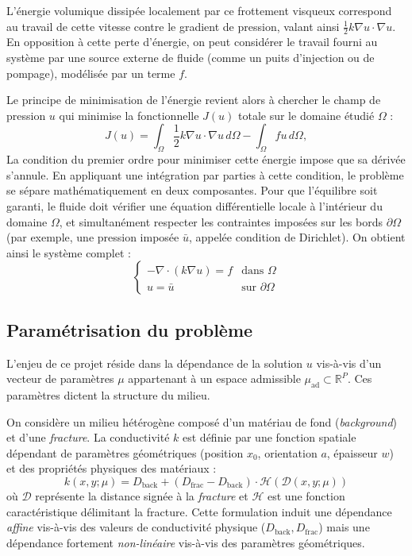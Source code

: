 \documentclass[12pt,a4paper]{article}
\begin{document}
L'énergie volumique dissipée localement par ce frottement visqueux correspond au travail de cette vitesse contre le gradient de pression, valant ainsi $\frac{1}{2} k \nabla u \cdot \nabla u$. 
En opposition à cette perte d'énergie, on peut considérer le travail fourni au système 
par une source externe de fluide (comme un puits d'injection ou de pompage), modélisée 
par un terme $f$.

Le principe de minimisation de l'énergie revient alors à chercher le champ de pression $u$ 
qui minimise la fonctionnelle $J(u)$ totale sur le domaine étudié $\Omega$ :
\begin{equation*}
    J(u) = \int_{\Omega} \frac{1}{2} k \nabla u \cdot \nabla u \, d\Omega - \int_{\Omega} f u \, d\Omega,
\end{equation*}
La condition du premier ordre pour minimiser cette énergie impose que sa dérivée s'annule. En appliquant une intégration par parties à cette condition, le problème se sépare mathématiquement en deux composantes. Pour que l'équilibre soit garanti, le fluide doit vérifier une équation différentielle locale à l'intérieur du domaine $\Omega$, et simultanément respecter les contraintes imposées sur les bords $\partial \Omega$ (par exemple, une pression imposée $\bar{u}$, appelée condition de Dirichlet). On obtient ainsi le système complet \cite{darcy_wiki} :
\begin{equation*}
  \begin{cases}
        -\nabla \cdot (k \nabla u) = f & \text{dans } \Omega \\
        u = \bar{u} & \text{sur } \partial \Omega
    \end{cases}
\end{equation*}

\subsection{Paramétrisation du problème}

L'enjeu de ce projet réside dans la dépendance de la solution $u$ vis-à-vis d'un vecteur de paramètres $\mu$ appartenant à un espace admissible $\mu_{\text{ad}} \subset \mathbb{R}^P$. Ces paramètres dictent la structure du milieu.


On considère un milieu hétérogène composé d'un matériau de fond (\textit{background}) et d'une \textit{fracture}. La conductivité $k$ est définie par une fonction spatiale dépendant de paramètres géométriques (position $x_0$, orientation $a$, épaisseur $w$) et des propriétés physiques des matériaux :
\begin{equation*}
    k(x, y; \mu) = D_{\text{back}} + (D_{\text{frac}} - D_{\text{back}}) \cdot \mathcal{H}(\mathcal{D}(x, y; \mu))
\end{equation*}
où $\mathcal{D}$ représente la distance signée à la \textit{fracture} et $\mathcal{H}$ est une fonction caractéristique délimitant la fracture. Cette formulation induit une dépendance \textit{affine} vis-à-vis des valeurs de conductivité physique ($D_{\text{back}}, D_{\text{frac}}$) mais une dépendance fortement \textit{non-linéaire} vis-à-vis des paramètres géométriques.
\end{document}
